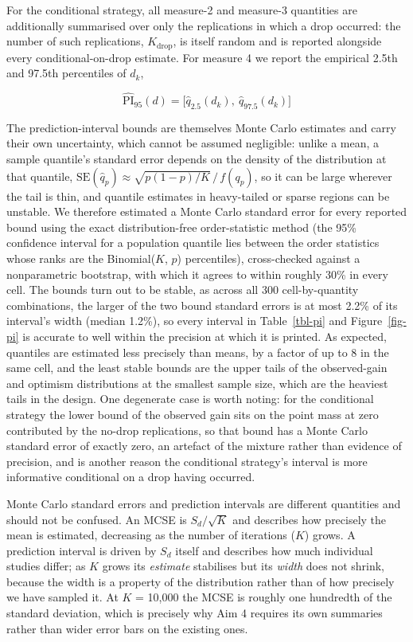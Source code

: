 \documentclass[
  nonatbib,
  authoryear,
  preprint]{elsarticle}
\begin{document}
For the conditional strategy, all measure-2 and measure-3 quantities are
additionally summarised over only the replications in which a drop
occurred: the number of such replications, \(K_{\text{drop}}\), is
itself random and is reported alongside every conditional-on-drop
estimate. For measure 4 we report the empirical 2.5th and 97.5th
percentiles of \(d_k\),

\[\widehat{\text{PI}}_{95}(d) = \big[\hat q_{2.5}(d_k),\ \hat q_{97.5}(d_k)\big]\]

The prediction-interval bounds are themselves Monte Carlo estimates and
carry their own uncertainty, which cannot be assumed negligible: unlike
a mean, a sample quantile's standard error depends on the density of the
distribution at that quantile,
\(\mathrm{SE}(\hat q_p) \approx \sqrt{p(1-p)/K} \,/\, f(q_p)\), so it
can be large wherever the tail is thin, and quantile estimates in
heavy-tailed or sparse regions can be unstable. We therefore estimated a
Monte Carlo standard error for every reported bound using the exact
distribution-free order-statistic method (the 95\% confidence interval
for a population quantile lies between the order statistics whose ranks
are the Binomial(\(K\), \(p\)) percentiles), cross-checked against a
nonparametric bootstrap, with which it agrees to within roughly 30\% in
every cell. The bounds turn out to be stable, as across all 300
cell-by-quantity combinations, the larger of the two bound standard
errors is at most 2.2\% of its interval's width (median 1.2\%), so every
interval in Table~\ref{tbl-pi} and Figure~\ref{fig-pi} is accurate to
well within the precision at which it is printed. As expected, quantiles
are estimated less precisely than means, by a factor of up to 8 in the
same cell, and the least stable bounds are the upper tails of the
observed-gain and optimism distributions at the smallest sample size,
which are the heaviest tails in the design. One degenerate case is worth
noting: for the conditional strategy the lower bound of the observed
gain sits on the point mass at zero contributed by the no-drop
replications, so that bound has a Monte Carlo standard error of exactly
zero, an artefact of the mixture rather than evidence of precision, and
is another reason the conditional strategy's interval is more
informative conditional on a drop having occurred.

Monte Carlo standard errors and prediction intervals are different
quantities and should not be confused. An MCSE is \(S_d/\sqrt{K}\) and
describes how precisely the mean is estimated, decreasing as the number
of iterations (\(K\)) grows. A prediction interval is driven by \(S_d\)
itself and describes how much individual studies differ; as \(K\) grows
its \emph{estimate} stabilises but its \emph{width} does not shrink,
because the width is a property of the distribution rather than of how
precisely we have sampled it. At \(K\) = 10,000 the MCSE is roughly one
hundredth of the standard deviation, which is precisely why Aim 4
requires its own summaries rather than wider error bars on the existing
ones.
\end{document}
